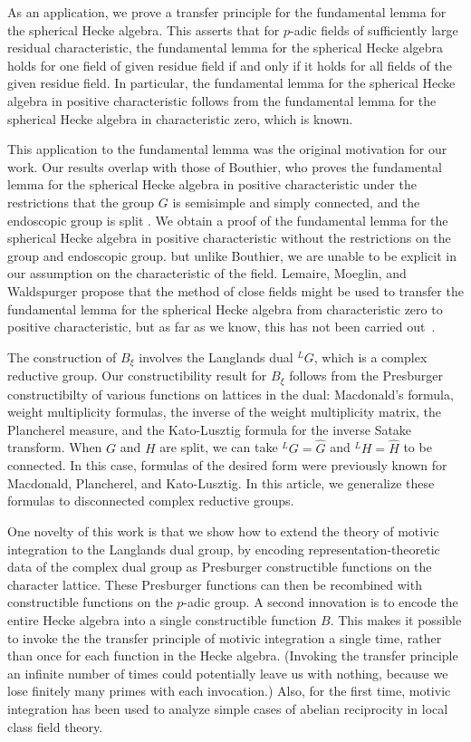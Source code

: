 As an application, we prove a transfer
principle for the fundamental lemma for the  spherical Hecke algebra.
This asserts that for $p$-adic
fields of sufficiently large residual characteristic, the fundamental lemma for the  spherical Hecke
algebra holds for one field of given residue field if and only if it holds for all fields of the given residue field.
In particular, the fundamental lemma for the spherical Hecke algebra in positive characteristic follows from the fundamental lemma 
for the spherical Hecke algebra in characteristic
zero, which is known.

This application to the fundamental lemma was the original motivation for our work.  Our results overlap with
those of Bouthier, who proves the fundamental lemma for the spherical Hecke algebra in positive
characteristic under the restrictions that the group $G$ is semisimple and simply connected, 
and the endoscopic group is split \cite[Theorem~0.2]{bouthier}.  We obtain a proof of the fundamental lemma for the
spherical Hecke algebra in positive characteristic without the restrictions on the group and endoscopic group.
but unlike Bouthier, we are unable to be explicit in our assumption
on the characteristic of the field.  Lemaire, Moeglin, and Waldspurger propose that the method of close fields might be used to transfer the
fundamental lemma for the spherical Hecke algebra from characteristic zero to positive characteristic, but as far as we know, 
this has not been
carried out~\cite[\S1.3]{LMW}.

The construction of $B_\xi$ involves the Langlands dual ${}^LG$, which is a complex reductive group.
Our constructibility result for $B_\xi$ follows from the  Presburger constructibilty of various
functions on lattices in the dual:  Macdonald's formula, weight multiplicity formulas, the inverse of the weight multiplicity matrix,
the Plancherel measure,
and the Kato-Lusztig formula for the inverse Satake transform.  
When $G$ and $H$ are split, we can take ${}^LG = \hat G$ and ${}^LH=\hat H$ to be connected.  In this case,
formulas of the desired form were previously known for Macdonald, Plancherel, and Kato-Lusztig.  In this article, we
generalize these formulas to disconnected complex reductive groups.


One novelty of this work is that we show how to extend the theory of motivic integration to the Langlands
dual group, by encoding representation-theoretic data of the complex dual group as Presburger constructible functions on the character lattice. These
Presburger functions can then be recombined with constructible functions on the $p$-adic group.  A second innovation is
to encode the entire Hecke algebra into a single constructible function $B$.  This makes it possible to invoke the the transfer
principle of motivic integration a single time, rather than once for each function in the Hecke algebra.  (Invoking the transfer principle
an infinite number of times could potentially leave us with nothing, because we lose finitely many primes with each invocation.)
Also, for the first time, motivic integration has been used to analyze simple cases of abelian reciprocity in local class field theory.


